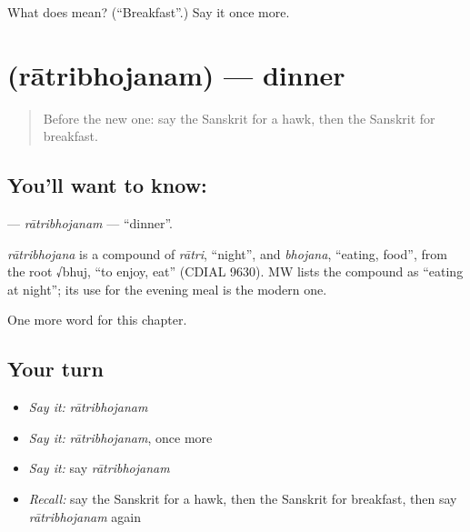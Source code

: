 \begin{tcolorbox}[breakable,colback=teal!4,colframe=teal!35!black,title={Before you move on}]
What does  mean? (\textquotedblleft{}Breakfast\textquotedblright{}.) Say it once more.
\end{tcolorbox}
\section[\texorpdfstring{\sk{रात्रिभोजनम्} (rātribhojanam)}{रात्रिभोजनम् (rātribhojanam)}]{ (rātribhojanam) — dinner}

\label{lesson:SA-C254-ratribhojanam}



\begin{quote}
Before the new one: say the Sanskrit for a hawk, then the Sanskrit for breakfast.
\end{quote}

\subsection*{You'll want to know: }
\textbf{} — \emph{rātribhojanam} — \textquotedblleft{}dinner\textquotedblright{}.

\begin{cousinweb}
\emph{rātribhojana} is a compound of \emph{rātri}, \textquotedblleft{}night\textquotedblright{}, and \emph{bhojana}, \textquotedblleft{}eating, food\textquotedblright{}, from the root √bhuj, \textquotedblleft{}to enjoy, eat\textquotedblright{} (CDIAL 9630). MW lists the compound as \textquotedblleft{}eating at night\textquotedblright{}; its use for the evening meal is the modern one.
\end{cousinweb}

\begin{grammarlens}[title={What you've built}]
One more word for this chapter.
\end{grammarlens}

\subsection*{Your turn}
\begin{itemize}
\raggedright
  \item \emph{Say it:} \emph{rātribhojanam}
  \item \emph{Say it:} \emph{rātribhojanam}, once more
  \item \emph{Say it:} say \emph{rātribhojanam}
  \item \emph{Recall:} say the Sanskrit for a hawk, then the Sanskrit for breakfast, then say \emph{rātribhojanam} again
\end{itemize}

